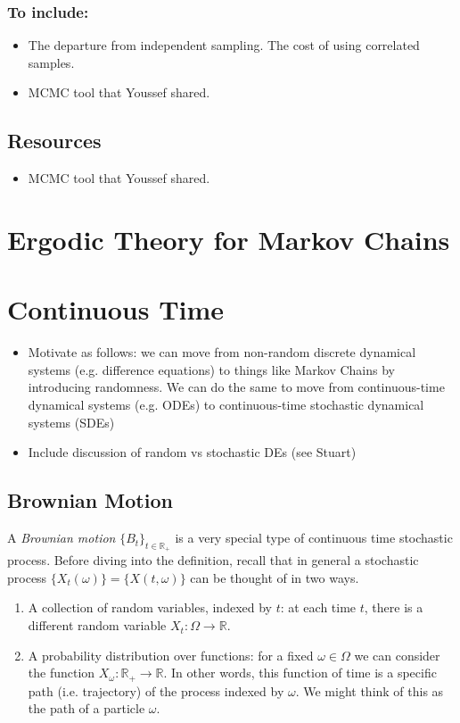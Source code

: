 \documentclass[12pt]{article}
\newcommand{\R}{\mathbb{R}}
\begin{document}
\subsubsection{To include:}
\begin{itemize}
\item The departure from independent sampling. The cost of using correlated samples. 
\item MCMC tool that Youssef shared. 
\end{itemize}

\subsection{Resources}
\begin{itemize}
\item MCMC tool that Youssef shared. 
\end{itemize}

\section{Ergodic Theory for Markov Chains}


\section{Continuous Time}
\begin{itemize}
\item Motivate as follows: we can move from non-random discrete dynamical systems (e.g. difference equations) to things like Markov Chains by introducing randomness. We can do the 
same to move from continuous-time dynamical systems (e.g. ODEs) to continuous-time stochastic dynamical systems (SDEs) 
\item Include discussion of random vs stochastic DEs (see Stuart)
\end{itemize}

\subsection{Brownian Motion}
A \textit{Brownian motion} $\{B_t\}_{t \in \R_+}$ is a very special type of continuous time stochastic process. Before diving into the definition, recall that in general a stochastic process 
$\{X_t(\omega)\} = \{X(t, \omega)\}$ can be thought of in two ways. 
\begin{enumerate}
\item A collection of random variables, indexed by $t$: at each time $t$, there is a different random variable $X_t: \Omega \to \R$. 
\item A probability distribution over functions: for a fixed $\omega \in \Omega$ we can consider the function $X_\omega: \R_+ \to \R$. In other words, this function of time is 
a specific path (i.e. trajectory) of the process indexed by $\omega$. We might think of this as the path of a particle $\omega$. 
\end{enumerate}
\end{document}
